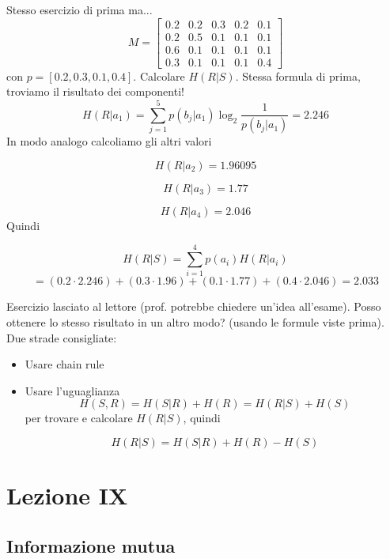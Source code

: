 \documentclass[12pt]{report}
\begin{document}
    \begin{es}
        Stesso esercizio di prima ma...
        \[ M =
        \begin{bmatrix}
            0.2 & 0.2 & 0.3 & 0.2 & 0.1  \\
            0.2 & 0.5 & 0.1 & 0.1 & 0.1 \\
            0.6 & 0.1 & 0.1 & 0.1 & 0.1 \\
            0.3 & 0.1 & 0.1 & 0.1 & 0.4
        \end{bmatrix}
        \]
        con $p = [0.2, 0.3, 0.1, 0.4]$. Calcolare $H(R|S)$. Stessa formula di prima, troviamo il risultato dei componenti!
        $$H(R|a_1) = \sum_{j = 1}^5 p(b_j|a_1) \log_2{\frac{1}{p(b_j|a_1)}} = 2.246$$
        In modo analogo calcoliamo gli altri valori

        $$H(R|a_2) = 1.96095$$

        $$H(R|a_3) = 1.77$$

        $$H(R|a_4) = 2.046 $$
        Quindi

        $$H(R|S) = \sum_{i=1}^4 p(a_i) H(R|a_i)$$
        $$= (0.2 \cdot 2.246) + (0.3 \cdot 1.96) + (0.1 \cdot 1.77) + (0.4 \cdot 2.046) = 2.033$$

    \end{es}

    \begin{es}
        Esercizio lasciato al lettore (prof. potrebbe chiedere un'idea all'esame).
        Posso ottenere lo stesso risultato in un altro modo? (usando le formule viste prima). Due strade consigliate:

        \begin{itemize}
            \item Usare chain rule
            \item Usare l'uguaglianza
            $$H(S,R) = H(S|R) + H(R) = H(R|S) + H(S)$$
            per trovare e calcolare $H(R|S)$, quindi

            $$H(R|S) = H(S|R) + H(R) - H(S)$$
        \end{itemize}
    \end{es}

    \chapter{Lezione IX}

    \section{Informazione mutua}
\end{document}
